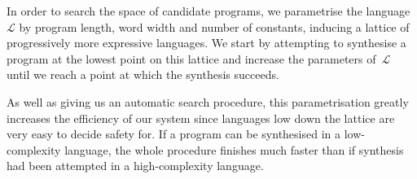 In order to search the space of candidate programs, we parametrise
the language~$\mathcal{L}$ by program length, word width and number of constants,
inducing a lattice of progressively
more expressive languages.  We start by attempting to synthesise
a program at the lowest point on this lattice and increase the
parameters of~$\mathcal{L}$ until we reach a point at which
the synthesis succeeds.

As well as giving us an automatic search procedure, this parametrisation
greatly increases the efficiency of our system since languages
low down the lattice are very easy to decide safety for.  If a program
can be synthesised in a low-complexity language, the whole procedure
finishes much faster than if synthesis had been attempted in a
high-complexity language.








